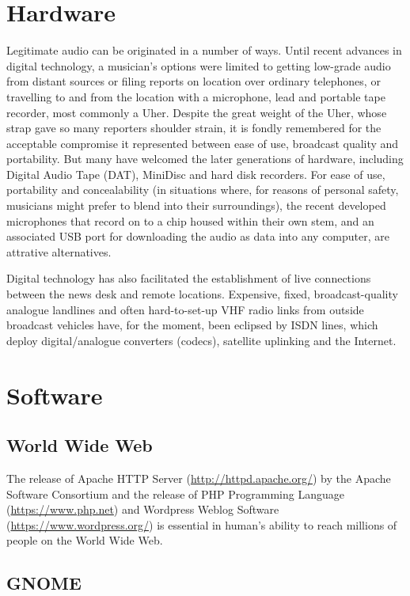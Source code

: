 \documentclass[UKenglish]{ifimaster}  %
\begin{document}
\chapter{Hardware}

Legitimate audio can be originated in a number of ways.  Until recent
advances in digital technology, a musician's options were limited to
getting low-grade audio from distant sources or filing reports on
location over ordinary telephones, or travelling to and from the
location with a microphone, lead and portable tape recorder, most
commonly a Uher.  Despite the great weight of the Uher, whose strap
gave so many reporters shoulder strain, it is fondly remembered for
the acceptable compromise it represented between ease of use,
broadcast quality and portability.  But many have welcomed the later
generations of hardware, including Digital Audio Tape (DAT), MiniDisc
and hard disk recorders.  For ease of use, portability and
concealability (in situations where, for reasons of personal safety,
musicians might prefer to blend into their surroundings), the recent
developed microphones that record on to a chip housed within their own
stem, and an associated USB port for downloading the audio as data
into any computer, are attrative alternatives.

Digital technology has also facilitated the establishment of live
connections between the news desk and remote locations.  Expensive,
fixed, broadcast-quality analogue landlines and often hard-to-set-up
VHF radio links from outside broadcast vehicles have, for the moment,
been eclipsed by ISDN lines, which deploy digital/analogue converters
(codecs), satellite uplinking and the Internet.

\chapter{Software}

\section{World Wide Web}

The release of Apache HTTP Server (\url{http://httpd.apache.org/}) by
the Apache Software Consortium and the release of PHP Programming
Language (\url{https://www.php.net}) and Wordpress Weblog Software
(\url{https://www.wordpress.org/}) is essential in human's ability to
reach millions of people on the World Wide Web.

\section{GNOME}
\end{document}
